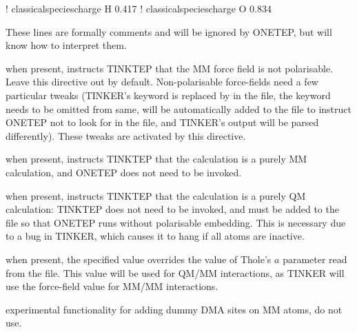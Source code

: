 \documentclass[letterpaper,10pt,english]{sphinxmanual}
\begin{document}
%
\begin{sphinxVerbatim}[commandchars=\\\{\}]
!\PYGZdl{} classical\PYGZus{}species\PYGZus{}charge H 0.417
!\PYGZdl{} classical\PYGZus{}species\PYGZus{}charge O \PYGZhy{}0.834
\end{sphinxVerbatim}

These lines are formally comments and will be ignored by ONETEP, but
 will know how to interpret them.

  \textendash{} when present,
instructs TINKTEP that the MM force field is not polarisable. Leave this
directive out by default. Non-polarisable force-fields need a few
particular tweaks (TINKER’s  keyword is replaced by
 in the  file, the  keyword needs
to be omitted from same,  will be
automatically added to the  file to instruct ONETEP not to look
for  in the  file, and
TINKER’s output will be parsed differently). These tweaks are
activated by this directive.

  \textendash{} when present, instructs
TINKTEP that the calculation is a purely MM calculation, and ONETEP does
not need to be invoked.

  \textendash{} when present, instructs
TINKTEP that the calculation is a purely QM calculation: TINKTEP does
not need to be invoked, and  must  be
added to the  file so that ONETEP runs without polarisable
embedding. This is necessary due to a bug in TINKER, which causes it to
hang if all atoms are inactive.

  \textendash{} when present, the
specified value overrides the value of Thole’s \(a\) parameter read
from the  file. This value will be used  for QM/MM
interactions, as TINKER will use the force-field value for MM/MM
interactions.

  \textendash{} experimental
functionality for adding dummy DMA sites on MM atoms, do not use.
\end{document}
